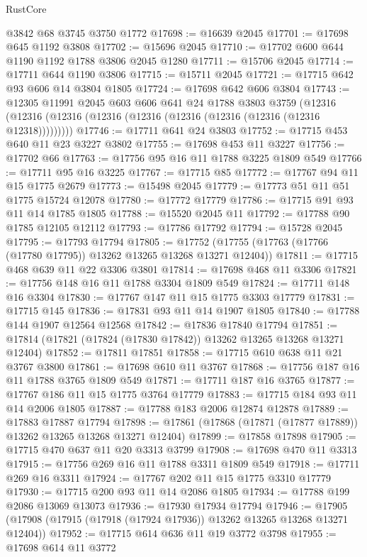 \begin{lexlean}{RustCore}
\begin{coremodule}
    @3842
    @68
    @3745
    @3750
    @1772
@17698 := @16639 @2045
@17701 := @17698 @645 @1192 @3808
@17702 := @15696 @2045
@17710 := @17702 @600 @644 @1190 @1192 @1788 @3806 @2045 @1280
@17711 := @15706 @2045
@17714 := @17711 @644 @1190 @3806
@17715 := @15711 @2045
@17721 := @17715 @642 @93 @606 @14 @3804 @1805
@17724 := @17698 @642 @606 @3804
@17743 := @12305
    @11991
    @2045
    @603
    @606
    @641
    @24
    @1788
    @3803
    @3759
    (@12316 (@12316 (@12316 (@12316 (@12316 (@12316 (@12316 (@12316 (@12316 @12318)))))))))
@17746 := @17711 @641 @24 @3803
@17752 := @17715 @453 @640 @11 @23 @3227 @3802
@17755 := @17698 @453 @11 @3227
@17756 := @17702 @66
@17763 := @17756 @95 @16 @11 @1788 @3225 @1809 @549
@17766 := @17711 @95 @16 @3225
@17767 := @17715 @85
@17772 := @17767 @94 @11 @15 @1775 @2679
@17773 := @15498 @2045
@17779 := @17773 @51 @11 @51 @1775 @15724 @12078
@17780 := @17772 @17779
@17786 := @17715 @91 @93 @11 @14 @1785 @1805
@17788 := @15520 @2045 @11
@17792 := @17788 @90 @1785 @12105 @12112
@17793 := @17786 @17792
@17794 := @15728 @2045
@17795 := @17793 @17794
@17805 := @17752 (@17755 (@17763 (@17766 (@17780 @17795)) @13262 @13265 @13268 @13271 @12404))
@17811 := @17715 @468 @639 @11 @22 @3306 @3801
@17814 := @17698 @468 @11 @3306
@17821 := @17756 @148 @16 @11 @1788 @3304 @1809 @549
@17824 := @17711 @148 @16 @3304
@17830 := @17767 @147 @11 @15 @1775 @3303 @17779
@17831 := @17715 @145
@17836 := @17831 @93 @11 @14 @1907 @1805
@17840 := @17788 @144 @1907 @12564 @12568
@17842 := @17836 @17840 @17794
@17851 := @17814 (@17821 (@17824 (@17830 @17842)) @13262 @13265 @13268 @13271 @12404)
@17852 := @17811 @17851
@17858 := @17715 @610 @638 @11 @21 @3767 @3800
@17861 := @17698 @610 @11 @3767
@17868 := @17756 @187 @16 @11 @1788 @3765 @1809 @549
@17871 := @17711 @187 @16 @3765
@17877 := @17767 @186 @11 @15 @1775 @3764 @17779
@17883 := @17715 @184 @93 @11 @14 @2006 @1805
@17887 := @17788 @183 @2006 @12874 @12878
@17889 := @17883 @17887 @17794
@17898 := @17861 (@17868 (@17871 (@17877 @17889)) @13262 @13265 @13268 @13271 @12404)
@17899 := @17858 @17898
@17905 := @17715 @470 @637 @11 @20 @3313 @3799
@17908 := @17698 @470 @11 @3313
@17915 := @17756 @269 @16 @11 @1788 @3311 @1809 @549
@17918 := @17711 @269 @16 @3311
@17924 := @17767 @202 @11 @15 @1775 @3310 @17779
@17930 := @17715 @200 @93 @11 @14 @2086 @1805
@17934 := @17788 @199 @2086 @13069 @13073
@17936 := @17930 @17934 @17794
@17946 := @17905 (@17908 (@17915 (@17918 (@17924 @17936)) @13262 @13265 @13268 @13271 @12404))
@17952 := @17715 @614 @636 @11 @19 @3772 @3798
@17955 := @17698 @614 @11 @3772

\end{coremodule}
\end{lexlean}
